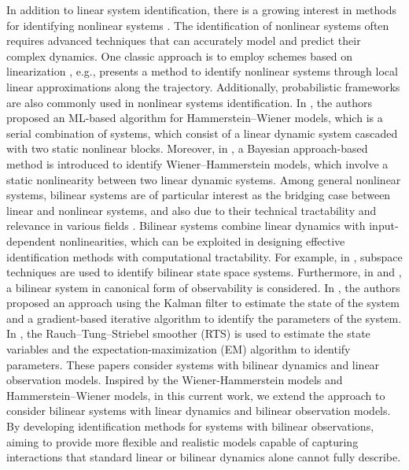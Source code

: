 In addition to linear system identification, there is a growing interest in methods for identifying nonlinear systems \cite{sattar2022non,bouvrie2017kernel,khosravi2021Koopman,umenberger2018maximum}. The identification of nonlinear systems often requires advanced techniques that can accurately model and predict their complex dynamics. One classic approach is to employ schemes based on linearization \cite{chen2004identification}, e.g.,  \cite{sharabiany2024nonlinear} presents a method to identify nonlinear systems through local linear approximations along the trajectory. Additionally, probabilistic frameworks are also commonly used in nonlinear systems identification. In \cite{wills2013identification}, the authors proposed an ML-based algorithm for Hammerstein--Wiener models, which is a serial combination of systems, 
which consist of a linear dynamic system cascaded with two  static nonlinear blocks.
%
%
Moreover, in \cite{liu2021identification}, a Bayesian approach-based method is introduced to identify Wiener--Hammerstein models, which involve a static nonlinearity between two linear dynamic systems. 
Among general nonlinear systems, bilinear systems are of particular interest as the bridging case between linear and nonlinear systems, and also due to their technical tractability and relevance in various fields \cite{pardalos2010optimization}.
Bilinear systems combine linear dynamics with input-dependent nonlinearities, which can be exploited in designing effective identification methods with computational tractability. For example, in \cite{verdult2001identification,verdult2005kernel}, subspace techniques are used to identify bilinear state space systems. Furthermore, in \cite{liu2020moving} and \cite{liu2022expectation}, a bilinear system in canonical form of observability is considered. In \cite{liu2020moving}, the authors proposed an approach using the Kalman filter to estimate the state of the system and a gradient-based iterative algorithm to identify the parameters of the system. In \cite{liu2022expectation}, the Rauch–Tung–Striebel smoother (RTS) is used to estimate the state variables and the expectation-maximization (EM) algorithm to identify parameters. These papers consider systems with bilinear dynamics and linear observation models. Inspired by the Wiener-Hammerstein models and Hammerstein–Wiener models, in this current work, we extend the approach to consider bilinear systems with linear dynamics and bilinear observation models. By developing identification methods for systems with bilinear observations, aiming to provide more flexible and realistic models capable of capturing interactions that standard linear or bilinear dynamics alone cannot fully describe. 
 
